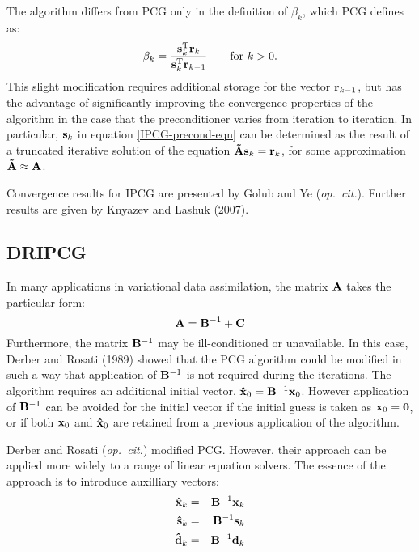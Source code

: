 \documentclass[12pt]{article}
\newcommand{\vect}[1]{{\bf #1}}                         %
\newcommand{\mat}[1]{{\bf #1}}                          %
\newcommand{\rmT}{{\rm T}}                           %
\begin{document}
The algorithm differs from PCG only in the definition of $\beta_k$, which
PCG defines as:
\begin{equation}
  \beta_k = \frac{\vect{s}_k^\rmT \vect{r}_k }
                 {\vect{s}_k^\rmT \vect{r}_{k-1} }
                                   \qquad\mbox{for $k>0$}. \\
\end{equation}
This slight modification requires additional storage for the vector
$\vect{r}_{k-1}$, but has the advantage of significantly improving the
convergence properties of the algorithm in the case that the preconditioner
varies from iteration to iteration. In particular, $\vect{s}_k$ in
equation \ref{IPCG-precond-eqn} can be determined as the result of a
truncated iterative solution of the equation
$\mat{\tilde A} \vect{s}_k = \vect{r}_k$, for some approximation
$\mat{\tilde A} \approx \mat{A}$.

Convergence results for IPCG are presented by Golub and Ye ({\it op.\ cit.\/}).
Further results are given by Knyazev and Lashuk (2007).

\subsection{DRIPCG}

In many applications in variational data assimilation, the matrix $\mat{A}$
takes the particular form:
\begin{equation}
   \mat{A} = \mat{B}^{-1} + \mat{C}
\end{equation}
Furthermore, the matrix $\mat{B}^{-1}$ may be ill-conditioned or
unavailable. In this case, Derber and Rosati (1989) showed that the
PCG algorithm could be modified in such a way that application of
$\mat{B}^{-1}$ is not required during the iterations.
The algorithm requires an additional initial vector,
$\vect{\hat x}_0 = \mat{B}^{-1} \vect{x}_0$. However application of
$\mat{B}^{-1}$ can be avoided for the initial vector if the initial
guess is taken as $\vect{x}_0 = \vect{0}$, or if both $\vect{x}_0$
and $\vect{\hat x}_0$ are retained from a previous application of
the algorithm.

Derber and Rosati ({\it op.\ cit.\/}) modified PCG. However, their approach
can be applied more widely to a range of linear equation solvers. The
essence of the approach is to introduce auxilliary vectors:
\begin{eqnarray}
  \vect{\hat x}_k &=& \mat{B}^{-1} \vect{x}_k \\
  \vect{\hat s}_k &=& \mat{B}^{-1} \vect{s}_k \\
  \vect{\hat d}_k &=& \mat{B}^{-1} \vect{d}_k
\end{eqnarray}
\end{document}
